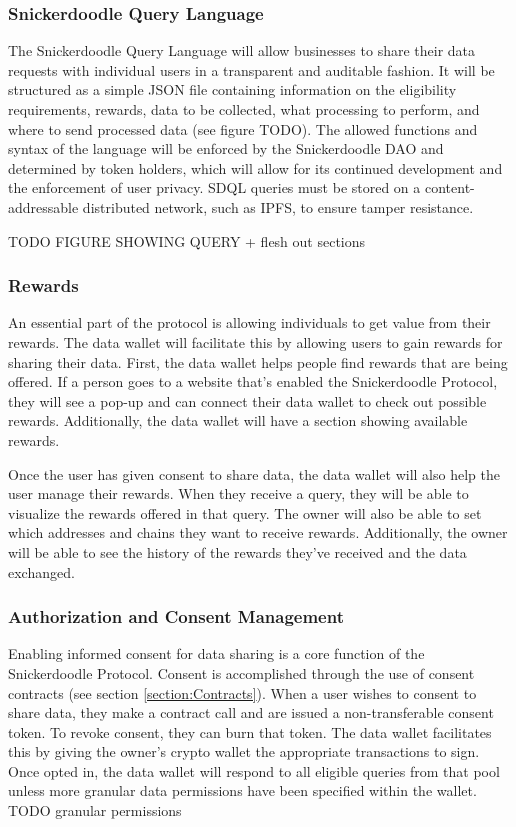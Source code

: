 \subsubsection{Snickerdoodle Query Language} %
\label{section:SDQL}

The Snickerdoodle Query Language will allow businesses to share their data requests with individual users in a transparent and auditable fashion. 
It will be structured as a simple JSON file containing information on the eligibility requirements, rewards, data to be collected, what processing 
to perform, and where to send processed data (see figure TODO). The allowed functions and syntax of the language will be enforced by the 
Snickerdoodle DAO and determined by token holders, which will allow for its continued development and the enforcement of user privacy. SDQL 
queries must be stored on a content-addressable distributed network, such as IPFS, to ensure tamper resistance. 

TODO FIGURE SHOWING QUERY + flesh out sections


\subsubsection{Rewards}

An essential part of the protocol is allowing individuals to get value from their rewards. The data wallet will facilitate this by allowing users 
to gain rewards for sharing their data. First, the data wallet helps people find rewards that are being offered. If a person goes to a website 
that's enabled the Snickerdoodle Protocol, they will see a pop-up and can connect their data wallet to check out possible rewards. Additionally, 
the data wallet will have a section showing available rewards.


Once the user has given consent to share data, the data wallet will also help the user manage their rewards. When they receive a query, they will 
be able to visualize the rewards offered in that query. The owner will also be able to set which addresses and chains they want to receive rewards. 
Additionally, the owner will be able to see the history of the rewards they've received and the data exchanged. 

\subsubsection{Authorization and Consent Management}

Enabling informed consent for data sharing is a core function of the Snickerdoodle Protocol. Consent is accomplished through the use of consent contracts 
(see section \ref{section:Contracts}). When a user wishes to consent to share data, they make a contract call and are issued a non-transferable consent 
token. To revoke consent, they can burn that token. The data wallet facilitates this by giving the owner's crypto wallet the appropriate transactions to 
sign. Once opted in, the data wallet will respond to all eligible queries from that pool unless more granular data permissions have been specified within 
the wallet. TODO granular permissions


